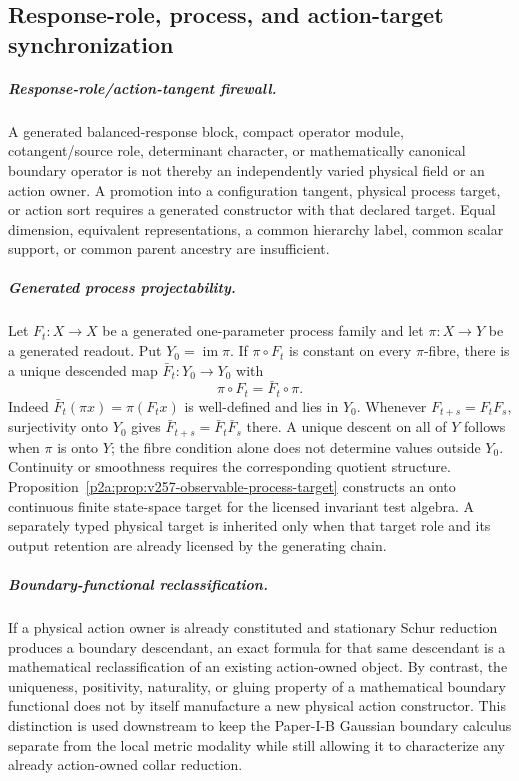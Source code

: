 \documentclass[12pt,a4paper]{article}
\begin{document}
\subsection{Response-role, process, and action-target synchronization}
\label{p2a:sec:v397-response-action-target-sync}

\subparagraph{Response-role/action-tangent firewall.}
A generated balanced-response block, compact operator module, cotangent/source
role, determinant character, or mathematically canonical boundary operator is
not thereby an independently varied physical field or an action owner.  A
promotion into a configuration tangent, physical process target, or action
sort requires a generated constructor with that declared target.  Equal
dimension, equivalent representations, a common hierarchy label, common
scalar support, or common parent ancestry are insufficient.

\subparagraph{Generated process projectability.}
Let $F_t:X\to X$ be a generated one-parameter process family and let
$\pi:X\to Y$ be a generated readout. Put $Y_0=\operatorname{im}\pi$.
If $\pi\circ F_t$ is constant on every $\pi$-fibre, there is a unique
descended map $\bar F_t:Y_0\to Y_0$ with
\[
 \pi\circ F_t=\bar F_t\circ\pi.
\]
Indeed $\bar F_t(\pi x)=\pi(F_tx)$ is well-defined and lies in $Y_0$.
Whenever $F_{t+s}=F_tF_s$, surjectivity onto $Y_0$ gives
$\bar F_{t+s}=\bar F_t\bar F_s$ there. A unique descent on all of $Y$
follows when $\pi$ is onto $Y$; the fibre condition alone does not
determine values outside $Y_0$. Continuity or smoothness requires the
corresponding quotient structure. Proposition~\ref{p2a:prop:v257-observable-process-target}
constructs an onto continuous finite state-space target for the licensed
invariant test algebra. A separately typed physical target is inherited
only when that target role and its output retention are already licensed
by the generating chain.

\subparagraph{Boundary-functional reclassification.}
If a physical action owner is already constituted and stationary Schur reduction
produces a boundary descendant, an exact formula for that same descendant is
a mathematical reclassification of an existing action-owned object.  By
contrast, the uniqueness, positivity, naturality, or gluing property of a
mathematical boundary functional does not by itself manufacture a new physical
action constructor.  This distinction is used downstream to keep the Paper-I-B
Gaussian boundary calculus separate from the local metric modality while still
allowing it to characterize any already action-owned collar reduction.
\end{document}
